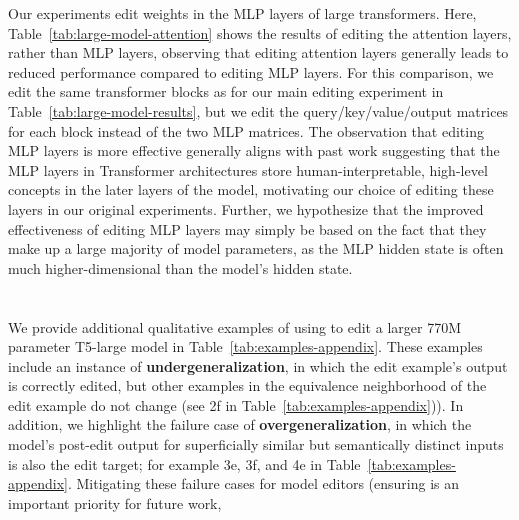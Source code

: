 Our experiments edit weights in the MLP layers of large transformers. Here, Table~\ref{tab:large-model-attention} shows the results of editing the attention layers, rather than MLP layers, observing that editing attention layers generally leads to reduced performance compared to editing MLP layers. For this comparison, we edit the same transformer blocks as for our main editing experiment in Table~\ref{tab:large-model-results}, but we edit the query/key/value/output matrices for each block instead of the two MLP matrices. The observation that editing MLP layers is more effective generally aligns with past work \citep{Geva2021TransformerFL} suggesting that the MLP layers in Transformer architectures store human-interpretable, high-level concepts in the later layers of the model, motivating our choice of editing these layers in our original experiments. Further, we hypothesize that the improved effectiveness of editing MLP layers may simply be based on the fact that they make up a large majority of model parameters, as the MLP hidden state is often much higher-dimensional than the model's hidden state.



\section{}
We provide additional qualitative examples of using {\name} to edit a larger 770M parameter T5-large model \citep{roberts2020knowledge} in Table~\ref{tab:examples-appendix}. These examples include an instance of \textbf{undergeneralization}, in which the edit example's output is correctly edited, but other examples in the equivalence neighborhood of the edit example do not change (see 2f in Table~\ref{tab:examples-appendix})). In addition, we highlight the failure case of \textbf{overgeneralization}, in which the model's post-edit output for superficially similar but semantically distinct inputs is also the edit target; for example 3e, 3f, and 4e in Table~\ref{tab:examples-appendix}. Mitigating these failure cases for model editors (ensuring is an important priority for future work,

